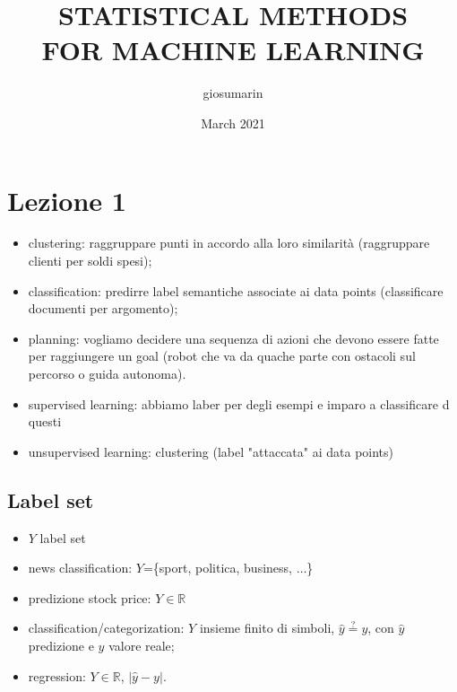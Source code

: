 \documentclass{article}
\title{STATISTICAL METHODS \\FOR MACHINE LEARNING}
\author{giosumarin}
\date{March 2021}
\begin{document}
\maketitle

\section{Lezione 1}
\begin{itemize}
	\item clustering: raggruppare punti in accordo alla loro similarità (raggruppare clienti per soldi spesi);
	\item classification: predirre label semantiche associate ai data points (classificare documenti per argomento);
	\item planning: vogliamo decidere una sequenza di azioni che devono essere fatte per raggiungere un goal (robot che va da quache parte con ostacoli sul percorso o guida autonoma).
	\item supervised learning: abbiamo laber per degli esempi e imparo a classificare d questi
	\item unsupervised learning: clustering (label "attaccata" ai data points)
\end{itemize}

\subsection{Label set}
\begin{itemize}
	\item $Y$ label set
	\item news classification: $Y$=\{sport, politica, business, $\dots$\}
	\item predizione stock price: $Y \in \mathbb{R}$
	\item classification/categorization: $Y$ insieme finito di simboli, $\hat{y} \overset{?}{=}y$, con $\hat{y}$ predizione e $y$ valore reale;
	\item regression: $Y \in \mathbb{R}$, $|\hat{y}-y|$.
\end{itemize}
\end{document}
